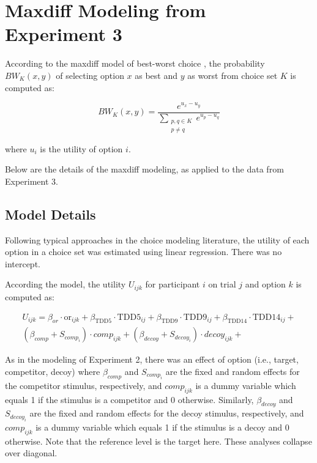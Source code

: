 \chapter{Maxdiff Modeling from Experiment 3}
According to the maxdiff model of best-worst choice \parencite{marleyProbabilisticModelsBest2005}, the probability $BW_{K}(x,y)$ of selecting option $x$ as best and $y$ as worst from choice set $K$ is computed as:

\begin{equation}
   BW_{K}(x,y)=\frac{e^{u_{x}-u_{y}}}{\sum_{\substack{{p,q}\in K\\p \neq q}} e^{u_{p}-u_{q}}}   
   \label{eqn:maxdiff_equation1}
\end{equation}

where $u_{i}$ is the utility of option $i$. 

Below are the details of the maxdiff modeling, as applied to the data from Experiment 3.

\section{Model Details}
Following typical approaches in the choice modeling literature, the utility of each option in a choice set was estimated using linear regression. There was no intercept.

According the model, the utility $U_{ijk}$ for participant $i$ on trial $j$ and option $k$ is computed as:

\begin{equation}
    \begin{aligned}
        U_{ijk}=\beta_{or} \cdot \mathrm{or}_{ijk} + \beta_{\mathrm{TDD}5} \cdot \mathrm{TDD}5_{ij} +\beta_{\mathrm{TDD}9} \cdot \mathrm{TDD}9_{ij} + \beta_{\mathrm{TDD}14} \cdot \mathrm{TDD}14_{ij}+\\
        (\beta_{comp}+S_{comp_i}) \cdot comp_{ijk}+(\beta_{decoy}+S_{decoy_i}) \cdot decoy_{ijk}+
        \label{maxdiff_U}
    \end{aligned}
\end{equation}

As in the modeling of Experiment 2, there was an effect of option (i.e., target, competitor, decoy) where $\beta_{comp}$ and $S_{comp_i}$ are the fixed and random effects for the competitor stimulus, respectively, and $comp_{ijk}$ is a dummy variable which equals 1 if the stimulus is a competitor and 0 otherwise. Similarly, $\beta_{decoy}$ and $S_{decoy_i}$ are the fixed and random effects for the decoy stimulus, respectively, and $comp_{ijk}$ is a dummy variable which equals 1 if the stimulus is a decoy and 0 otherwise. Note that the reference level is the target here. These analyses collapse over diagonal.


